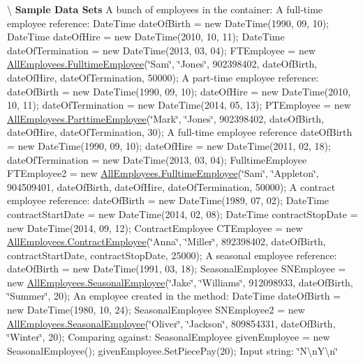 \textbackslash{} {\bfseries  Sample Data Sets} A bunch of employees in the container\+: A full-\/time employee reference\+: Date\+Time date\+Of\+Birth = new Date\+Time(1990, 09, 10); Date\+Time date\+Of\+Hire = new Date\+Time(2010, 10, 11); Date\+Time date\+Of\+Termination = new Date\+Time(2013, 03, 04); F\+T\+Employee = new \hyperlink{class_all_employees_1_1_fulltime_employee}{All\+Employees.\+Fulltime\+Employee}(\char`\"{}\+Sam\char`\"{}, \char`\"{}\+Jones\char`\"{}, 902398402, date\+Of\+Birth, date\+Of\+Hire, date\+Of\+Termination, 50000); A part-\/time employee reference\+: date\+Of\+Birth = new Date\+Time(1990, 09, 10); date\+Of\+Hire = new Date\+Time(2010, 10, 11); date\+Of\+Termination = new Date\+Time(2014, 05, 13); P\+T\+Employee = new \hyperlink{class_all_employees_1_1_parttime_employee}{All\+Employees.\+Parttime\+Employee}(\char`\"{}\+Mark\char`\"{}, \char`\"{}\+Jones\char`\"{}, 902398402, date\+Of\+Birth, date\+Of\+Hire, date\+Of\+Termination, 30); A full-\/time employee reference date\+Of\+Birth = new Date\+Time(1990, 09, 10); date\+Of\+Hire = new Date\+Time(2011, 02, 18); date\+Of\+Termination = new Date\+Time(2013, 03, 04); Fulltime\+Employee F\+T\+Employee2 = new \hyperlink{class_all_employees_1_1_fulltime_employee}{All\+Employees.\+Fulltime\+Employee}(\char`\"{}\+Sam\char`\"{}, \char`\"{}\+Appleton\char`\"{}, 904509401, date\+Of\+Birth, date\+Of\+Hire, date\+Of\+Termination, 50000); A contract employee reference\+: date\+Of\+Birth = new Date\+Time(1989, 07, 02); Date\+Time contract\+Start\+Date = new Date\+Time(2014, 02, 08); Date\+Time contract\+Stop\+Date = new Date\+Time(2014, 09, 12); Contract\+Employee C\+T\+Employee = new \hyperlink{class_all_employees_1_1_contract_employee}{All\+Employees.\+Contract\+Employee}(\char`\"{}\+Anna\char`\"{}, \char`\"{}\+Miller\char`\"{}, 892398402, date\+Of\+Birth, contract\+Start\+Date, contract\+Stop\+Date, 25000); A seasonal employee reference\+: date\+Of\+Birth = new Date\+Time(1991, 03, 18); Seasonal\+Employee S\+N\+Employee = new \hyperlink{class_all_employees_1_1_seasonal_employee}{All\+Employees.\+Seasonal\+Employee}(\char`\"{}\+Jake\char`\"{}, \char`\"{}\+Williams\char`\"{}, 912098933, date\+Of\+Birth, \char`\"{}\+Summer\char`\"{}, 20); An employee created in the method\+: Date\+Time date\+Of\+Birth = new Date\+Time(1980, 10, 24); Seasonal\+Employee S\+N\+Employee2 = new \hyperlink{class_all_employees_1_1_seasonal_employee}{All\+Employees.\+Seasonal\+Employee}(\char`\"{}\+Oliver\char`\"{}, \char`\"{}\+Jackson\char`\"{}, 809854331, date\+Of\+Birth, \char`\"{}\+Winter\char`\"{}, 20); Comparing against\+: Seasonal\+Employee given\+Employee = new Seasonal\+Employee(); given\+Employee.\+Set\+Piece\+Pay(20); Input string\+: \char`\"{}\+N\textbackslash{}n\+Y\textbackslash{}n\char`\"{}

